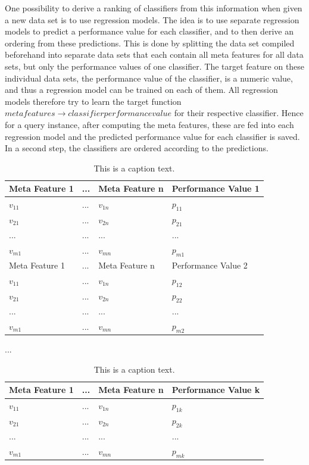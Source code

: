 One possibility to derive a ranking of classifiers from this information when given a new data set is to use regression models. The idea is to use separate regression models to predict a performance value for each classifier, and to then derive an ordering from these predictions. This is done by splitting the data set compiled beforehand into separate data sets that each contain all meta features for all data sets, but only the performance values of one classifier. The target feature on these individual data sets, the performance value of the classifier, is a numeric value, and thus a regression model can be trained on each of them. All regression models therefore try to learn the target function $meta features \rightarrow classifier performance value$ for their respective classifier. Hence for a query instance, after computing the meta features, these are fed into each regression model and the predicted performance value for each classifier is saved. In a second step, the classifiers are ordered according to the predictions.

\begin{table}[h]
\centering
	\begin{tabularx}{\textwidth}{X | X | X | X}
		Meta Feature 1	& ... 	& Meta Feature n		& Performance Value 1	\\ \hline
		$v_{11}$			& ...	& $v_{1n}$			& $p_{11}$				\\ \hline
		$v_{21}$			& ...	& $v_{2n}$			& $p_{21}$				\\ \hline
		...				& ...	& ...				& ...					\\ \hline
		$v_{m1}$			& ... 	& $v_{mn}$			& $p_{m1}$				\\ \hline\hline
		Meta Feature 1	& ... 	& Meta Feature n		& Performance Value 2 	\\ \hline
		$v_{11}$			& ...	& $v_{1n}$			& $p_{12}$				\\ \hline
		$v_{21}$			& ...	& $v_{2n}$			& $p_{22}$				\\ \hline
		...				& ...	& ...				& ...					\\ \hline
		$v_{m1}$			& ... 	& $v_{mn}$			& $p_{m2}$					 
	\end{tabularx}
	
\vspace{1em}
...
\vspace{1em}	
	
	\begin{tabularx}{\textwidth}{X | X | X | X}
		Meta Feature 1	& ... 	& Meta Feature n		& Performance Value k 	\\ \hline
		$v_{11}$			& ...	& $v_{1n}$			& $p_{1k}$				\\ \hline
		$v_{21}$			& ...	& $v_{2n}$			& $p_{2k}$				\\ \hline
		...				& ...	& ...				& ...					\\ \hline
		$v_{m1}$			& ... 	& $v_{mn}$			& $p_{mk}$					 
	\end{tabularx}
	
	\label{tab:table1}
	\caption{This is a caption text.}
\end{table}

